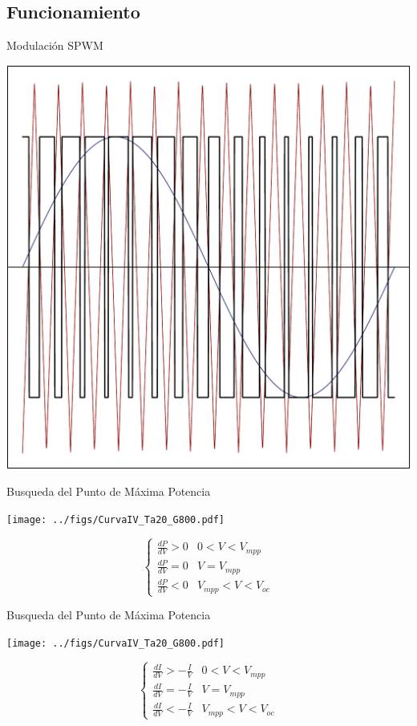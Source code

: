 \documentclass[xcolor={usenames,svgnames,dvipsnames}]{beamer}
\begin{document}
\subsection{Funcionamiento}
\label{sec:org0cffa1d}
\begin{frame}[label={sec:orgf75f2a0}]{Modulación SPWM}
\begin{center}
\includegraphics[width=.9\linewidth]{../figs/SPWMMonofasico.pdf}
\end{center}
\end{frame}

\begin{frame}[label={sec:orgf66a2fc}]{Busqueda del Punto de Máxima Potencia}
\begin{center}
\texttt{[image: ../figs/CurvaIV\_Ta20\_G800.pdf]}
\end{center}

$$\begin{cases}
      \frac{dP}{dV}>0 & 0<V<V_{mpp}\\
      \frac{dP}{dV}=0 & V=V_{mpp}\\
      \frac{dP}{dV}<0 & V_{mpp}<V<V_{oc}\end{cases}$$
\end{frame}

\begin{frame}[label={sec:orgf784836}]{Busqueda del Punto de Máxima Potencia}
\begin{center}
\texttt{[image: ../figs/CurvaIV\_Ta20\_G800.pdf]}
\end{center}

$$\begin{cases}
      \frac{dI}{dV}>-\frac{I}{V} & 0<V<V_{mpp}\\
      \frac{dI}{dV}=-\frac{I}{V} & V=V_{mpp}\\
      \frac{dI}{dV}<-\frac{I}{V} & V_{mpp}<V<V_{oc}\end{cases}$$
\end{frame}
\end{document}
